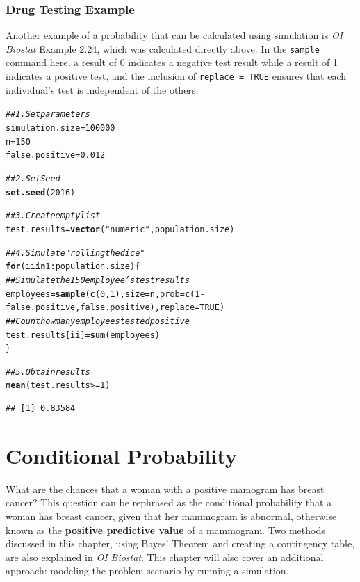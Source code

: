 \documentclass{report}\usepackage[]{graphicx}\usepackage[]{color}
\makeatletter
\newcommand{\hlnum}[1]{\textcolor[rgb]{0.686,0.059,0.569}{#1}}%
\newcommand{\hlstr}[1]{\textcolor[rgb]{0.192,0.494,0.8}{#1}}%
\newcommand{\hlcom}[1]{\textcolor[rgb]{0.678,0.584,0.686}{\textit{#1}}}%
\newcommand{\hlopt}[1]{\textcolor[rgb]{0,0,0}{#1}}%
\newcommand{\hlstd}[1]{\textcolor[rgb]{0.345,0.345,0.345}{#1}}%
\newcommand{\hlkwa}[1]{\textcolor[rgb]{0.161,0.373,0.58}{\textbf{#1}}}%
\newcommand{\hlkwb}[1]{\textcolor[rgb]{0.69,0.353,0.396}{#1}}%
\newcommand{\hlkwc}[1]{\textcolor[rgb]{0.333,0.667,0.333}{#1}}%
\newcommand{\hlkwd}[1]{\textcolor[rgb]{0.737,0.353,0.396}{\textbf{#1}}}%
\newenvironment{kframe}{%
 \def\at@end@of@kframe{}%
 \ifinner\ifhmode%
  \def\at@end@of@kframe{\end{minipage}}%
  \begin{minipage}{\columnwidth}%
 \fi\fi%
 \def\FrameCommand##1{\hskip\@totalleftmargin \hskip-\fboxsep
 \colorbox{shadecolor}{##1}\hskip-\fboxsep
     \hskip-\linewidth \hskip-\@totalleftmargin \hskip\columnwidth}%
 \MakeFramed {\advance\hsize-\width
   \@totalleftmargin\z@ \linewidth\hsize
   \@setminipage}}%
 {\par\unskip\endMakeFramed%
 \at@end@of@kframe}
\newenvironment{knitrout}{}{} %
\makeatother
\begin{document}
\subsubsection{Drug Testing Example}
Another example of a probability that can be calculated using simulation is \textit{OI Biostat} Example 2.24, which was calculated directly above.  In the \texttt{sample} command here, a result of 0 indicates a negative test result while a result of 1 indicates a positive test, and the inclusion of \texttt{replace = TRUE} ensures that each individual's test is independent of the others.  

\begin{knitrout}
\color{fgcolor}\begin{kframe}
\begin{alltt}
\hlcom{## 1. Set parameters }
\hlstd{simulation.size} \hlkwb{=} \hlnum{100000}
\hlstd{n} \hlkwb{=} \hlnum{150}
\hlstd{false.positive} \hlkwb{=} \hlnum{0.012}

\hlcom{## 2. Set Seed }
\hlkwd{set.seed}\hlstd{(}\hlnum{2016}\hlstd{)}

\hlcom{## 3. Create empty list }
\hlstd{test.results} \hlkwb{=} \hlkwd{vector}\hlstd{(}\hlstr{"numeric"}\hlstd{, population.size)}

\hlcom{## 4. Simulate "rolling the dice" }
\hlkwa{for}\hlstd{(ii} \hlkwa{in} \hlnum{1}\hlopt{:}\hlstd{population.size)\{}
  \hlcom{## Simulate the 150 employee's test results}
  \hlstd{employees} \hlkwb{=} \hlkwd{sample}\hlstd{(}\hlkwd{c}\hlstd{(}\hlnum{0}\hlstd{,}\hlnum{1}\hlstd{),} \hlkwc{size} \hlstd{= n,} \hlkwc{prob} \hlstd{=} \hlkwd{c}\hlstd{(}\hlnum{1}\hlopt{-}\hlstd{false.positive, false.positive),} \hlkwc{replace} \hlstd{=} \hlnum{TRUE}\hlstd{)}
  \hlcom{## Count how many employees tested positive }
  \hlstd{test.results[ii]} \hlkwb{=} \hlkwd{sum}\hlstd{(employees)}
\hlstd{\}}

\hlcom{## 5. Obtain results }
\hlkwd{mean}\hlstd{(test.results}\hlopt{>=}\hlnum{1}\hlstd{)}
\end{alltt}
\begin{verbatim}
## [1] 0.83584
\end{verbatim}
\end{kframe}
\end{knitrout}


\section{Conditional Probability}
What are the chances that a woman with a positive mamogram has breast cancer? This question can be rephrased as the conditional probability that a woman has breast cancer, given that her mammogram is abnormal, otherwise known as the \textbf{positive predictive value} of a mammogram. Two methods discussed in this chapter, using Bayes' Theorem and creating a contingency table, are also explained in \textit{OI Biostat}. This chapter will also cover an additional approach: modeling the problem scenario by running a simulation.
\end{document}
